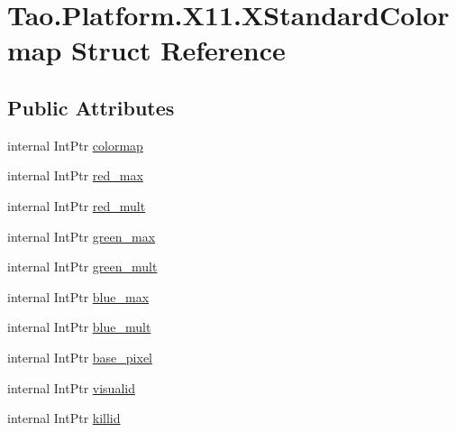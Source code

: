 \hypertarget{struct_tao_1_1_platform_1_1_x11_1_1_x_standard_colormap}{
\section{Tao.Platform.X11.XStandardColormap Struct Reference}
\label{struct_tao_1_1_platform_1_1_x11_1_1_x_standard_colormap}
}
\subsection*{Public Attributes}
\begin{DoxyCompactItemize}
\item 
internal IntPtr \hyperlink{struct_tao_1_1_platform_1_1_x11_1_1_x_standard_colormap_ab49dd3711c62dfb1506e938f108a6aa4}{colormap}
\item 
internal IntPtr \hyperlink{struct_tao_1_1_platform_1_1_x11_1_1_x_standard_colormap_ae1f7beda08f461493902b17293468932}{red\_\-max}
\item 
internal IntPtr \hyperlink{struct_tao_1_1_platform_1_1_x11_1_1_x_standard_colormap_aa186fa91a4c03cd28bc4c895f38f41e8}{red\_\-mult}
\item 
internal IntPtr \hyperlink{struct_tao_1_1_platform_1_1_x11_1_1_x_standard_colormap_a9e37698d0d58b69e9b2aee7cf1661b05}{green\_\-max}
\item 
internal IntPtr \hyperlink{struct_tao_1_1_platform_1_1_x11_1_1_x_standard_colormap_a9d86617d7345be997933758a36870270}{green\_\-mult}
\item 
internal IntPtr \hyperlink{struct_tao_1_1_platform_1_1_x11_1_1_x_standard_colormap_a4d1d316a7caaad430396b318e8c1120c}{blue\_\-max}
\item 
internal IntPtr \hyperlink{struct_tao_1_1_platform_1_1_x11_1_1_x_standard_colormap_ad5673bf69199006ecc3b84de42aac996}{blue\_\-mult}
\item 
internal IntPtr \hyperlink{struct_tao_1_1_platform_1_1_x11_1_1_x_standard_colormap_a476a79bcf4e6d7580c2ad29d2c92dea3}{base\_\-pixel}
\item 
internal IntPtr \hyperlink{struct_tao_1_1_platform_1_1_x11_1_1_x_standard_colormap_a0a88c184ee116a8358b344eefe0a093e}{visualid}
\item 
internal IntPtr \hyperlink{struct_tao_1_1_platform_1_1_x11_1_1_x_standard_colormap_ab85578e0af13c4c7e690e9e8711ee85d}{killid}
\end{DoxyCompactItemize}


